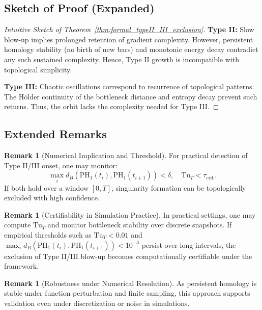 \documentclass[11pt]{article}
\theoremstyle{definition}
\newtheorem{remark}[theorem]{Remark}
\begin{document}
\subsection*{Sketch of Proof (Expanded)}

\begin{proof}[Intuitive Sketch of Theorem~\ref{thm:formal_typeII_III_exclusion}]
\textbf{Type II:} Slow blow-up implies prolonged retention of gradient complexity. However, persistent homology stability (no birth of new bars) and monotonic energy decay contradict any such sustained complexity. Hence, Type II growth is incompatible with topological simplicity.

\textbf{Type III:} Chaotic oscillations correspond to recurrence of topological patterns. The Hölder continuity of the bottleneck distance and entropy decay prevent such returns. Thus, the orbit lacks the complexity needed for Type III.
\end{proof}

\subsection*{Extended Remarks}

\begin{remark}[Numerical Implication and Threshold]
For practical detection of Type II/III onset, one may monitor:
\[
\max_{i} d_B(\mathrm{PH}_1(t_i), \mathrm{PH}_1(t_{i+1})) < \delta, \quad \mathrm{Tu}_T < \tau_{\text{crit}}.
\]
If both hold over a window $[0,T]$, singularity formation can be topologically excluded with high confidence.
\end{remark}

\begin{remark}[Certifiability in Simulation Practice]
In practical settings, one may compute $\mathrm{Tu}_T$ and monitor bottleneck stability over discrete snapshots. If empirical thresholds such as $\mathrm{Tu}_T < 0.01$ and $\max_i d_B(\mathrm{PH}_1(t_i), \mathrm{PH}_1(t_{i+1})) < 10^{-3}$ persist over long intervals, the exclusion of Type II/III blow-up becomes computationally certifiable under the framework.
\end{remark}

\begin{remark}[Robustness under Numerical Resolution]
As persistent homology is stable under function perturbation and finite sampling, this approach supports validation even under discretization or noise in simulations.
\end{remark}
\end{document}
